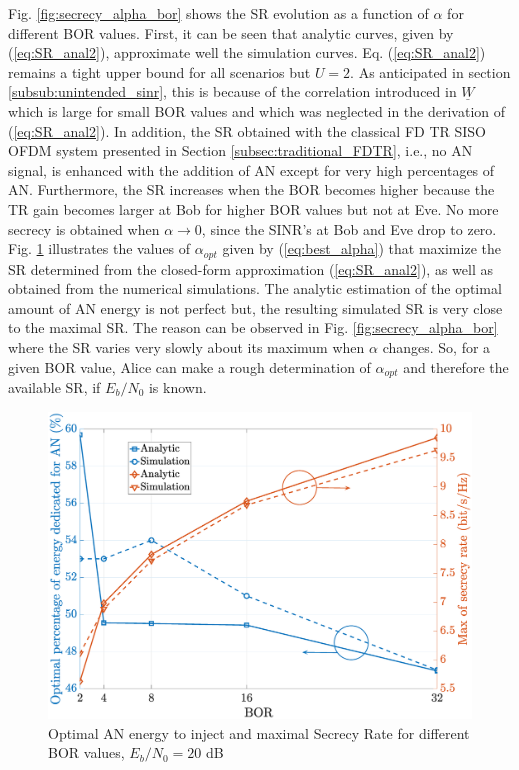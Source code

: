 \documentclass[conference]{IEEEtran}
\begin{document}
Fig. \ref{fig:secrecy_alpha_bor} shows the SR evolution as a function of $\alpha$ for different BOR values. First, it can be seen that analytic curves, given by (\ref{eq:SR_anal2}), approximate well the simulation curves. Eq. (\ref{eq:SR_anal2}) remains a tight upper bound for all scenarios but $U=2$. As anticipated in section \ref{subsub:unintended_sinr}, this is because of the correlation introduced in $\underline{W}$ which is large for small BOR values and which was neglected in the derivation of (\ref{eq:SR_anal2}). In addition, the SR obtained with the classical FD TR SISO OFDM system presented in Section \ref{subsec:traditional_FDTR}, i.e., no AN signal, is enhanced with the addition of AN except for very high percentages of AN. Furthermore, the SR increases when the BOR becomes higher because the TR gain becomes larger at Bob for higher BOR values but not at Eve. No more secrecy is obtained when $\alpha \to 0$, since the SINR's at Bob and Eve drop to zero.\\
Fig. \ref{fig:secrecy_alpha_bor_optimal} illustrates the values of $\alpha_{opt}$ given by (\ref{eq:best_alpha}) that maximize the SR determined from the closed-form approximation (\ref{eq:SR_anal2}), as well as obtained from the numerical simulations. The analytic estimation of the optimal amount of AN energy is not perfect but, the resulting simulated SR is very close to the maximal SR. The reason can be observed in Fig. \ref{fig:secrecy_alpha_bor} where the SR varies very slowly about its maximum when $\alpha$ changes. So, for a given BOR value, Alice can make a rough determination of $\alpha_{opt}$ and therefore the available SR, if $E_b/N_0$ is known.  



\begin{figure}[t]
    \centering
    \centerline{\includegraphics[width = .37\textwidth]{img/final_optimal_alpha.eps}}
    \caption{Optimal AN energy to inject and maximal Secrecy Rate for different BOR values, $E_b/N_0=20$ dB}
    \label{fig:secrecy_alpha_bor_optimal}
\end{figure}
\end{document}
